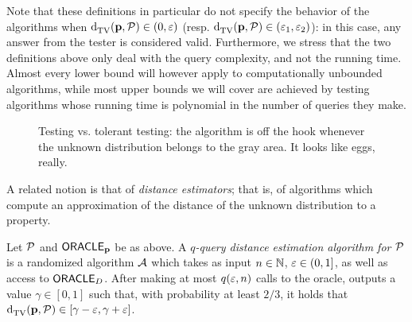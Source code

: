 Note that these definitions in particular do not specify the behavior of the algorithms when ${\operatorname{d}_{\textrm{TV}}^{}\!\left({\mathbf{p}, \mathcal{P}}\right)} \in (0,\varepsilon)$ (resp. ${\operatorname{d}_{\textrm{TV}}^{}\!\left({\mathbf{p}, \mathcal{P}}\right)} \in (\varepsilon_1,\varepsilon_2)$): in this case, any answer from the tester is considered valid. Furthermore, we stress that the two definitions above only deal with the query complexity, and not the running time. Almost every lower bound will however apply to computationally unbounded algorithms, while most upper bounds we will cover are achieved by testing algorithms whose running time is polynomial in the number of queries they make.

\begin{figure}[H]\centering
  \caption{\label{fig:testing:tolerant:testing}Testing vs. tolerant testing: the algorithm is off the hook whenever the unknown distribution belongs to the gray area. It looks like eggs, really.}
\end{figure}

A related notion is that of \emph{distance estimators}; that is, of algorithms which compute an approximation of the distance of the unknown distribution to a property.
\begin{definition}\label{def:distance:estimation}
  Let $\mathcal{P}$ and ${\sf ORACLE}_{\mathbf{p}}$ be as above. A \emph{$q$-query distance estimation algorithm for $\mathcal{P}$} is a randomized algorithm $\mathcal{A}$ which takes as input $n\in\mathbb{N}$, $\varepsilon\in(0,1]$, as well as access to ${\sf ORACLE}_D$. After making at most $q(\varepsilon,n)$ calls to the oracle, \Tester outputs a value $\gamma\in[0,1]$ such that,  with probability at least $2/3$, it holds that ${\operatorname{d}_{\textrm{TV}}^{}\!\left({\mathbf{p}, \mathcal{P}}\right)}\in[\gamma-\varepsilon, \gamma+\varepsilon]$.
\end{definition}

